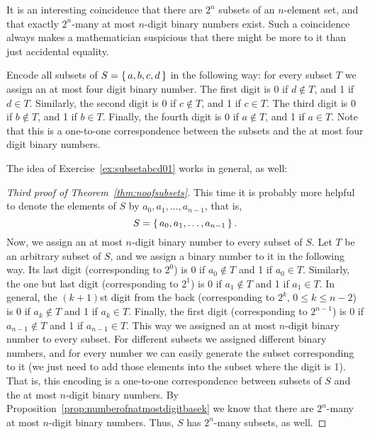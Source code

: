 It is an interesting coincidence that there are $2^n$ subsets of an $n$-element set, 
and that exactly $2^n$-many at most $n$-digit binary numbers exist. 
Such a coincidence always makes a mathematician suspicious 
that there might be more to it than just accidental equality. 

\begin{exercise}\label{ex:subsetabcd01}
Encode all subsets of $S = \left\{\,a, b, c, d\,\right\}$ in the following way: 
for every subset $T$ we assign an at most four digit binary number. 
The first digit is 0 if $d \notin T$, and 1 if $d \in T$. 
Similarly, the second digit is 0 if $c \notin T$, and 1 if $c \in T$. 
The third digit is 0 if $b \notin T$, and 1 if $b \in T$. 
Finally, the fourth digit is 0 if $a \notin T$, and 1 if $a \in T$. 
Note that this is a one-to-one correspondence between the subsets and the at most four digit binary numbers. 
\end{exercise}

The idea of Exercise~\ref{ex:subsetabcd01} works in general, as well: 

\begin{proof}[Third proof of Theorem~\ref{thm:noofsubsets}]
This time it is probably more helpful to denote the elements of $S$ by $a_0, a_1, \dots , a_{n-1}$, 
that is, 
\[
S = \left\{\,a_0, a_1, \dots , a_{n-1}\,\right\}. 
\]
Now, we assign an at most $n$-digit binary number to every subset of $S$. 
Let $T$ be an arbitrary subset of $S$, 
and we assign a binary number to it in the following way. 
Its last digit (corresponding to $2^0$) is 0 if $a_0 \notin T$ and 1 if $a_0 \in T$. 
Similarly, the one but last digit (corresponding to $2^1$) is 0 if $a_1 \notin T$ and 1 if $a_1 \in T$. 
In general, the $(k+1)$st digit from the back (corresponding to $2^k$, $0\leq k\leq n-2$) is 0 if $a_k \notin T$ and 1 if $a_k \in T$. 
Finally, the first digit (corresponding to $2^{n-1}$) is 0 if $a_{n-1} \notin T$ and 1 if $a_{n-1} \in T$. 
This way we assigned an at most $n$-digit binary number to every subset. 
For different subsets we assigned different binary numbers, 
and for every number we can easily generate the subset corresponding to it 
(we just need to add those elements into the subset where the digit is 1). 
That is, this encoding is a one-to-one correspondence between subsets of $S$ and the at most $n$-digit binary numbers. 
By Proposition~\ref{prop:numberofnatmostdigitbasek} we know that there are $2^n$-many at most $n$-digit binary numbers. 
Thus, $S$ has $2^n$-many subsets, as well. 
\end{proof}

